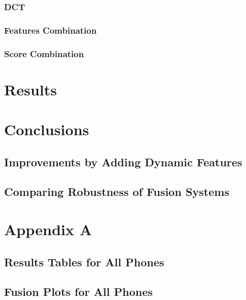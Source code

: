 \documentclass[11pt,a4paper]{tesis}
\begin{document}
		\subsection{DCT}
		\subsection{Features Combination}
		\subsection{Score Combination}

\chapter{Results}
	

\chapter{Conclusions}
	\section{Improvements by Adding Dynamic Features}
	\section{Comparing Robustness of Fusion Systems}

\chapter{Appendix A}
	\section{Results Tables for All Phones}
		
	\section{Fusion Plots for All Phones}
		

\printbibliography
\end{document}
